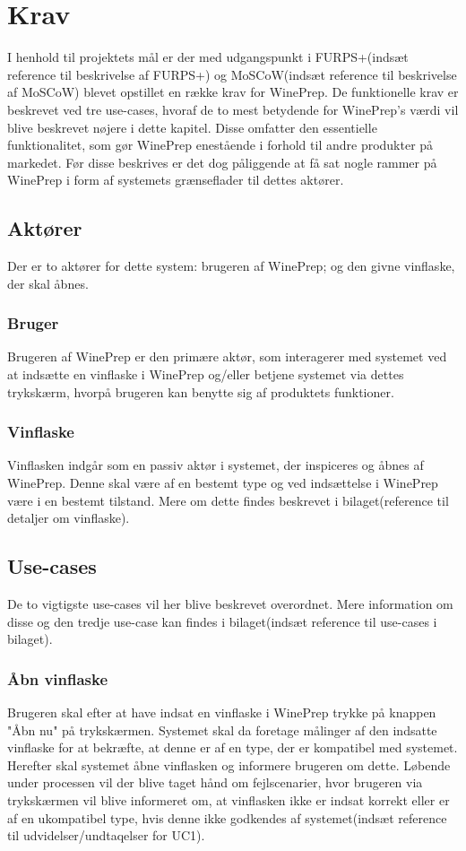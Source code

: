 \chapter{Krav}
I henhold til projektets mål er der med udgangspunkt i FURPS+(indsæt reference til beskrivelse af FURPS+) og MoSCoW(indsæt reference til beskrivelse af MoSCoW) blevet opstillet en række krav for WinePrep. De funktionelle krav er beskrevet ved tre use-cases, hvoraf de to mest betydende for WinePrep's værdi vil blive beskrevet nøjere i dette kapitel. Disse omfatter den essentielle funktionalitet, som gør WinePrep enestående i forhold til andre produkter på markedet. Før disse beskrives er det dog påliggende at få sat nogle rammer på WinePrep i form af systemets grænseflader til dettes aktører.

\section{Aktører}
Der er to aktører for dette system: brugeren af WinePrep; og den givne vinflaske, der skal åbnes.

\subsection{Bruger}
Brugeren af WinePrep er den primære aktør, som interagerer med systemet ved at indsætte en vinflaske i WinePrep og/eller betjene systemet via dettes trykskærm, hvorpå brugeren kan benytte sig af produktets funktioner.

\subsection{Vinflaske}
Vinflasken indgår som en passiv aktør i systemet, der inspiceres og åbnes af WinePrep. Denne skal være af en bestemt type og ved indsættelse i WinePrep være i en bestemt tilstand. Mere om dette findes beskrevet i bilaget(reference til detaljer om vinflaske).

\section{Use-cases}
De to vigtigste use-cases vil her blive beskrevet overordnet. Mere information om disse og den tredje use-case kan findes i bilaget(indsæt reference til use-cases i bilaget).

\subsection{Åbn vinflaske}
Brugeren skal efter at have indsat en vinflaske i WinePrep trykke på knappen "Åbn nu" på trykskærmen. Systemet skal da foretage målinger af den indsatte vinflaske for at bekræfte, at denne er af en type, der er kompatibel med systemet. Herefter skal systemet åbne vinflasken og informere brugeren om dette. Løbende under processen vil der blive taget hånd om fejlscenarier, hvor brugeren via trykskærmen vil blive informeret om, at vinflasken ikke er indsat korrekt eller er af en ukompatibel type, hvis denne ikke godkendes af systemet(indsæt reference til udvidelser/undtaqelser for UC1).

